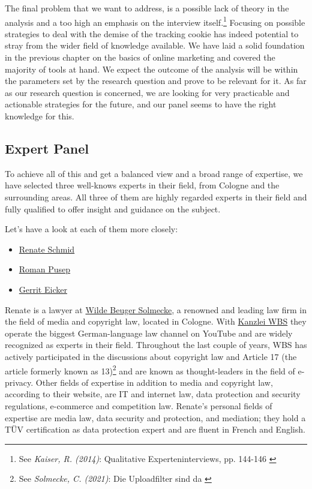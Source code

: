 The final problem that we want to address, is a possible lack of theory in the analysis and a too high an emphasis on the interview itself.\footnote{See \textit{Kaiser, R. (2014)}: Qualitative Experteninterviews, pp. 144-146 \cite{expertInterviews}} Focusing on possible strategies to deal with the demise of the tracking cookie has indeed potential to stray from the wider field of knowledge available. We have laid a solid foundation in the previous chapter on the basics of online marketing and covered the majority of tools at hand. We expect the outcome of the analysis will be within the parameters set by the research question and prove to be relevant for it. As far as our research question is concerned, we are looking for very practicable and actionable strategies for the future, and our panel seems to have the right knowledge for this.

\subsection{Expert Panel}

To achieve all of this and get a balanced view and a broad range of expertise, we have selected three well-knows experts in their field, from Cologne and the surrounding areas. All three of them are highly regarded experts in their field and fully qualified to offer insight and guidance on the subject.

Let's have a look at each of them more closely:

\begin{itemize}
 \item \href{https://www.linkedin.com/in/renate-schmid-535233113/}{Renate Schmid}
 \item \href{https://www.linkedin.com/in/roman-pusep-36b33374/}{Roman Pusep}
 \item \href{https://www.linkedin.com/in/eicker/}{Gerrit Eicker}
\end{itemize}

Renate is a lawyer at \href{https://www.wbs-law.de/}{Wilde Beuger Solmecke}, a renowned and leading law firm in the field of media and copyright law, located in Cologne. With \href{https://www.youtube.com/user/KanzleiWBS}{Kanzlei WBS} they operate the biggest German-language law channel on YouTube and are widely recognized as experts in their field. Throughout the last couple of years, WBS has actively participated in the discussions about copyright law and Article 17 (the article formerly known as 13)\footnote{See \textit{Solmecke, C. (2021)}: Die Uploadfilter sind da \cite{article17}} and are known as thought-leaders in the field of e-privacy. Other fields of expertise in addition to media and copyright law, according to their website, are IT and internet law, data protection and security regulations, e-commerce and competition law. Renate's personal fields of expertise are media law, data security and protection, and mediation; they hold a TÜV certification as data protection expert and are fluent in French and English.

